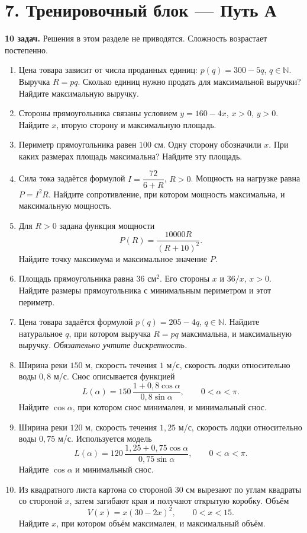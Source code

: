 \documentclass[a4paper,12pt]{article}
\newcommand{\N}{\mathbb{N}}
\begin{document}
\section*{7. Тренировочный блок --- Путь А}
\textbf{10 задач.} Решения в этом разделе не приводятся. Сложность возрастает постепенно.

\begin{enumerate}[label=\textbf{\arabic*.}]
  \item Цена товара зависит от числа проданных единиц: \(p(q)=300-5q\), \(q\in\N\). Выручка \(R=pq\). Сколько единиц нужно продать для максимальной выручки? Найдите максимальную выручку.

  \item Стороны прямоугольника связаны условием \(y=160-4x\), \(x>0\), \(y>0\). Найдите \(x\), вторую сторону и максимальную площадь.

  \item Периметр прямоугольника равен \(100\) см. Одну сторону обозначили \(x\). При каких размерах площадь максимальна? Найдите эту площадь.

  \item Сила тока задаётся формулой \(I=\dfrac{72}{6+R}\), \(R>0\). Мощность на нагрузке равна \(P=I^2R\). Найдите сопротивление, при котором мощность максимальна, и максимальную мощность.

  \item Для \(R>0\) задана функция мощности
  \[
  P(R)=\frac{10000R}{(R+10)^2}.
  \]
  Найдите точку максимума и максимальное значение \(P\).

  \item Площадь прямоугольника равна \(36\text{ см}^2\). Его стороны \(x\) и \(36/x\), \(x>0\). Найдите размеры прямоугольника с минимальным периметром и этот периметр.

  \pagebreak[4]

  \item Цена товара задаётся формулой \(p(q)=205-4q\), \(q\in\N\). Найдите натуральное \(q\), при котором выручка \(R=pq\) максимальна, и максимальную выручку. \emph{Обязательно учтите дискретность.}

  \item Ширина реки \(150\) м, скорость течения \(1\) м/с, скорость лодки относительно воды \(0{,}8\) м/с. Снос описывается функцией
  \[
  L(\alpha)=150\,\frac{1+0{,}8\cos\alpha}{0{,}8\sin\alpha},\qquad 0<\alpha<\pi.
  \]
  Найдите \(\cos\alpha\), при котором снос минимален, и минимальный снос.

  \item Ширина реки \(120\) м, скорость течения \(1{,}25\) м/с, скорость лодки относительно воды \(0{,}75\) м/с. Используется модель
  \[
  L(\alpha)=120\,\frac{1{,}25+0{,}75\cos\alpha}{0{,}75\sin\alpha},\qquad 0<\alpha<\pi.
  \]
  Найдите \(\cos\alpha\) и минимальный снос.

  \item Из квадратного листа картона со стороной \(30\) см вырезают по углам квадраты со стороной \(x\), затем загибают края и получают открытую коробку. Объём
  \[
  V(x)=x(30-2x)^2,\qquad 0<x<15.
  \]
  Найдите \(x\), при котором объём максимален, и максимальный объём.
\end{enumerate}
\end{document}
